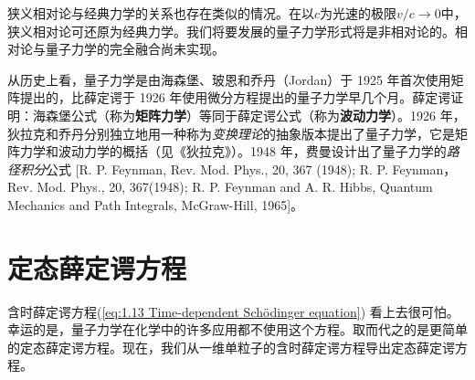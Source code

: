 	狭义相对论与经典力学的关系也存在类似的情况。在以$c$为光速的极限$v/c \rightarrow 0$中，狭义相对论可还原为经典力学。我们将要发展的量子力学形式将是非相对论的。相对论与量子力学的完全融合尚未实现。

	从历史上看，量子力学是由海森堡、玻恩和乔丹（Jordan）于 1925 年首次使用矩阵提出的，比薛定谔于 1926 年使用微分方程提出的量子力学早几个月。薛定谔证明：海森堡公式（称为\textbf{矩阵力学}）等同于薛定谔公式（称为\textbf{波动力学}）。1926 年，狄拉克和乔丹分别独立地用一种称为\textit{变换理论}的抽象版本提出了量子力学，它是矩阵力学和波动力学的概括（见《狄拉克》）。1948 年，费曼设计出了量子力学的\textit{路径积分}公式 [R. P. Feynman, Rev. Mod. Phys., 20, 367 (1948); R. P. Feynman，Rev. Mod. Phys., 20, 367(1948); R. P. Feynman and A. R. Hibbs, Quantum Mechanics and Path Integrals, McGraw-Hill, 1965]。

	\section{定态薛定谔方程}
	\label{sec:1.5 The Time-Independent Schrödinger Equation}
	含时薛定谔方程(\ref{eq:1.13 Time-dependent Schödinger equation}) 看上去很可怕。幸运的是，量子力学在化学中的许多应用都不使用这个方程。取而代之的是更简单的定态薛定谔方程。现在，我们从一维单粒子的含时薛定谔方程导出定态薛定谔方程。

